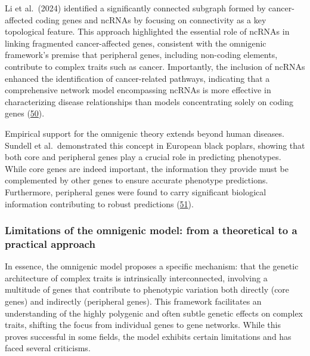 Li et al.~(2024) identified a significantly connected subgraph formed by cancer-affected coding genes and ncRNAs by focusing on connectivity as a key topological feature.
This approach highlighted the essential role of ncRNAs in linking fragmented cancer-affected genes, consistent with the omnigenic framework's premise that peripheral genes, including non-coding elements, contribute to complex traits such as cancer.
Importantly, the inclusion of ncRNAs enhanced the identification of cancer-related pathways, indicating that a comprehensive network model encompassing ncRNAs is more effective in characterizing disease relationships than models concentrating solely on coding genes (\protect\hyperlink{ref-13VkGrWQR}{50}).

Empirical support for the omnigenic theory extends beyond human diseases.
Sundell et al.~demonstrated this concept in European black poplars, showing that both core and peripheral genes play a crucial role in predicting phenotypes.
While core genes are indeed important, the information they provide must be complemented by other genes to ensure accurate phenotype predictions.
Furthermore, peripheral genes were found to carry significant biological information contributing to robust predictions (\protect\hyperlink{ref-EgquVUSg}{51}).

\hypertarget{limitations-of-the-omnigenic-model-from-a-theoretical-to-a-practical-approach}{%
\subsubsection{Limitations of the omnigenic model: from a theoretical to a practical approach}\label{limitations-of-the-omnigenic-model-from-a-theoretical-to-a-practical-approach}}

In essence, the omnigenic model proposes a specific mechanism: that the genetic architecture of complex traits is intrinsically interconnected, involving a multitude of genes that contribute to phenotypic variation both directly (core genes) and indirectly (peripheral genes).
This framework facilitates an understanding of the highly polygenic and often subtle genetic effects on complex traits, shifting the focus from individual genes to gene networks.
While this proves successful in some fields, the model exhibits certain limitations and has faced several criticisms.

